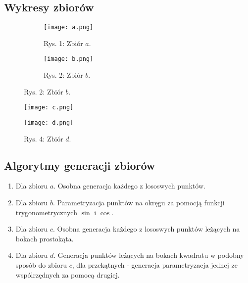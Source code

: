 \subsection{Wykresy zbiorów}
\begin{figure}[!h]
    \centering
    \begin{subfigure}{.5\textwidth}
      \centering
      \texttt{[image: a.png]}
      \caption*{Rys. 1: Zbiór $a$.}
      \label{fig:sub1}
    \end{subfigure}%
    \begin{subfigure}{.5\textwidth}
      \centering
      \texttt{[image: b.png]}
      \caption*{Rys. 2: Zbiór $b$.}
      \label{fig:sub2}
    \end{subfigure}
    \label{fig:test}
    \end{figure}
    \begin{figure}[!h]
    \centering
    \begin{minipage}{.5\textwidth}
      \centering
      \texttt{[image: c.png]}
      \caption*{Rys. 3: Zbiór $c$.}
      \label{fig:test1}
    \end{minipage}%
    \begin{minipage}{.5\textwidth}
      \centering
      \texttt{[image: d.png]}
      \caption*{Rys. 4: Zbiór $d$.}
      \label{fig:test2}
    \end{minipage}
    \end{figure}
\null
    \subsection{Algorytmy generacji zbiorów}
    \begin{enumerate}
    \item Dla zbioru $a$. Osobna generacja każdego z lososwych punktów.
    \item Dla zbioru $b$. Parametryzacja punktów na okręgu za pomocją funkcji trygonometrycznych $\sin$ i $\cos$.
    \item Dla zbioru $c$. Osobna generacja każdego z lososwych punktów leżących na bokach prostokąta.
    \item Dla zbioru $d$. Generacja punktów leżących na bokach kwadratu w podobny sposób do 
    zbioru $c$, dla przekątnych - generacja parametryzacja jednej ze wspólrzędnych za pomocą drugiej.
    \end{enumerate}
